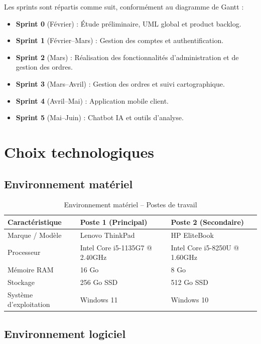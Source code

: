 \documentclass[12pt,a4paper,oneside]{report}
\begin{document}
Les sprints sont répartis comme suit, conformément au diagramme de Gantt :
\begin{itemize}
    \item \textbf{Sprint 0} (Février) : Étude préliminaire, UML global et product backlog.
    \item \textbf{Sprint 1} (Février--Mars) : Gestion des comptes et authentification.
    \item \textbf{Sprint 2} (Mars) : Réalisation des fonctionnalités d'administration et de gestion des ordres.
    \item \textbf{Sprint 3} (Mars--Avril) : Gestion des ordres et suivi cartographique.
    \item \textbf{Sprint 4} (Avril--Mai) : Application mobile client.
    \item \textbf{Sprint 5} (Mai--Juin) : Chatbot IA et outils d'analyse.
\end{itemize}

\section{Choix technologiques}

\subsection{Environnement matériel}

\begin{table}[H]
\centering
\caption{Environnement matériel -- Postes de travail}
\begin{tabular}{|p{3.5cm}|p{5cm}|p{5cm}|}
\hline
\textbf{Caractéristique} & \textbf{Poste 1 (Principal)} & \textbf{Poste 2 (Secondaire)} \\
\hline
Marque / Modèle & Lenovo ThinkPad & HP EliteBook \\
\hline
Processeur & Intel Core i5-1135G7 @ 2.40GHz & Intel Core i5-8250U @ 1.60GHz \\
\hline
Mémoire RAM & 16 Go & 8 Go \\
\hline
Stockage & 256 Go SSD & 512 Go SSD \\
\hline
Système d'exploitation & Windows 11 & Windows 10 \\
\hline
\end{tabular}
\end{table}

\subsection{Environnement logiciel}
\end{document}

